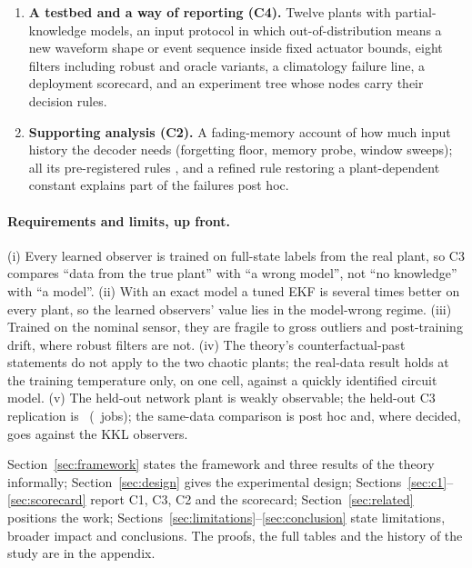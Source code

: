 \begin{enumerate}[leftmargin=1.6em,itemsep=1pt]
\item \textbf{A testbed and a way of reporting (C4).} Twelve plants with partial-knowledge models, an input protocol in which out-of-distribution means a new waveform shape or event sequence inside fixed actuator bounds, eight filters including robust and oracle variants, a climatology failure line, a deployment scorecard, and an experiment tree whose nodes carry their decision rules.
\item \textbf{Supporting analysis (C2).} A fading-memory account of how much input history the decoder needs (forgetting floor, memory probe, window sweeps); all its pre-registered rules \FAIL, and a refined rule restoring a plant-dependent constant explains part of the failures post hoc.
\end{enumerate}

\paragraph{Requirements and limits, up front.} (i) Every learned observer is trained on full-state labels from the real plant, so C3 compares ``data from the true plant'' with ``a wrong model'', not ``no knowledge'' with ``a model''. (ii) With an exact model a tuned EKF is several times better on every plant, so the learned observers' value lies in the model-wrong regime. (iii) Trained on the nominal sensor, they are fragile to gross outliers and post-training drift, where robust filters are not. (iv) The theory's counterfactual-past statements do not apply to the two chaotic plants; the real-data result holds at the training temperature only, on one cell, against a quickly identified circuit model. (v) The held-out network plant is weakly observable; the held-out C3 replication is \OutcomeTESTCThree\ (\JobsTESTCThree\ jobs); the same-data comparison is post hoc and, where decided, goes against the KKL observers.

Section~\ref{sec:framework} states the framework and three results of the theory informally; Section~\ref{sec:design} gives the experimental design; Sections~\ref{sec:c1}--\ref{sec:scorecard} report C1, C3, C2 and the scorecard; Section~\ref{sec:related} positions the work; Sections~\ref{sec:limitations}--\ref{sec:conclusion} state limitations, broader impact and conclusions. The proofs, the full tables and the history of the study are in the appendix.
